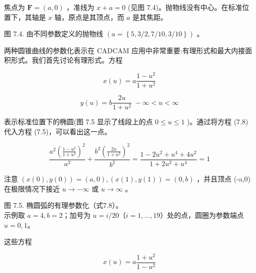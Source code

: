 \documentclass[../main.tex]{subfiles}
\begin{document}
焦点为 \(\mathbf{F} = \left( {a,0}\right)\) ，准线为 \(x + a = 0\) (见图 7.4)。抛物线没有中心。在标准位置下，其轴是 \(x\) 轴，原点是其顶点，而 \(a\) 是其焦距。

\begin{center}
\begin{minipage}{18cm}
\vspace*{.6\baselineskip}
\centering
{}
\par\smallskip
图 7.4. 由不同参数定义的抛物线 \(\left( {a = \left\{  {5,3/2,7/{10},3/{10}}\right\}  }\right)\) 。
\end{minipage}
\end{center}

两种圆锥曲线的参数化表示在 CADCAM 应用中非常重要:有理形式和最大内接面积形式。我们首先讨论有理形式。方程

\[
x\left( u\right)  = a\frac{1 - {u}^{2}}{1 + {u}^{2}}
\]

\[
y\left( u\right)  = b\frac{2u}{1 + {u}^{2}}\; - \infty  < u < \infty  \tag{7.8}
\]

表示标准位置下的椭圆(图 7.5 显示了线段上的点 \(0 \leq  u \leq  1\) )。通过将方程 (7.8) 代入方程 (7.5)，可以看出这一点。

\[
\frac{{a}^{2}{\left( \frac{1 - {u}^{2}}{1 + {u}^{2}}\right) }^{2}}{{a}^{2}} + \frac{{b}^{2}{\left( \frac{2u}{1 + {u}^{2}}\right) }^{2}}{{b}^{2}} = \frac{1 - 2{u}^{2} + {u}^{4} + 4{u}^{2}}{1 + 2{u}^{2} + {u}^{4}} = 1
\]



注意 \(\left( {x\left( 0\right) ,y\left( 0\right) }\right)  = \left( {a,0}\right) ,\left( {x\left( 1\right) ,y\left( 1\right) }\right)  = \left( {0,b}\right)\) ，并且顶点 (-a,0) 在极限情况下接近 \(u \rightarrow   - \infty\) 或 \(u \rightarrow  \infty\) 。

\begin{center}
\begin{minipage}{16cm}
\vspace*{.6\baselineskip}
\centering
{}
\par\smallskip
图 7.5. 椭圆弧的有理参数化（式7.8）。\\
示例取 $a=4,b=2$；加号为 $u=i/20$（$i=1,\ldots,19$）处的点，圆圈为参数端点 $u=0,1$。
\end{minipage}
\end{center}

这些方程

\[
x\left( u\right)  = a\frac{1 + {u}^{2}}{1 - {u}^{2}}
\]
\end{document}
